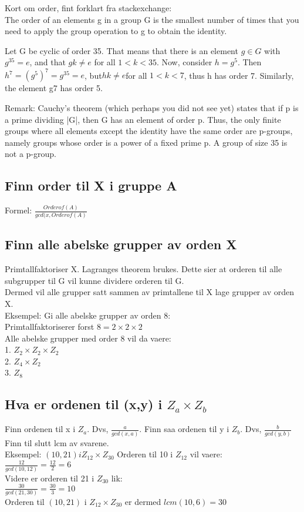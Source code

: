 \documentclass[12pt,a4paper]{article}
\begin{document}
Kort om order, fint forklart fra stackexchange:\\
The order of an elements g in a group G is the smallest number of times that you need to apply the group operation to g to obtain the identity.

Let G be cyclic of order 35. That means that there is an element $g \in G$ with $g^{35}=e$, and that $gk\neq e$ for all $1<k<35$. Now, consider $h=g^5.$ Then $h^7=(g^5)^7=g^{35}=e$, but$ hk \neq e $for all $1<k<7$, thus h has order 7. Similarly, the element g7 has order 5.

Remark: Cauchy's theorem (which perhaps you did not see yet) states that if p is a prime dividing |G|, then G has an element of order p. Thus, the only finite groups where all elements except the identity have the same order are p-groups, namely groups whose order is a power of a fixed prime p. A group of size 35 is not a p-group.

\subsection*{Finn order til X i gruppe A}
Formel: $\frac{Order of(A)}{gcd(x, Order of (A)}$

\subsection*{Finn alle abelske grupper av orden X}
Primtallfaktoriser X. Lagranges theorem brukes. Dette sier at orderen til alle subgrupper til G vil kunne dividere orderen til G. \\
Dermed vil alle grupper satt sammen av primtallene til X lage grupper av orden X.\\
Eksempel: Gi alle abelske grupper av orden 8:\\
Primtallfaktoriserer forst $8 = 2 \times 2 \times 2$\\
Alle abelske grupper med order 8 vil da vaere:\\
1. $Z_2 \times Z_2 \times Z_2$\\
2. $Z_4 \times Z_2$\\
3. $Z_8$

\subsection*{Hva er ordenen til (x,y) i $Z_a \times Z_b$}
Finn ordenen til x i $Z_a$. Dvs, $\frac{a}{gcd(x,a)}. $
Finn saa ordenen til y i $Z_b$. Dvs, $\frac{b}{gcd(y,b)}$
Finn til slutt lcm av svarene.\\
Eksempel: $(10,21) i Z_{12} \times Z_{30}$
Orderen til 10 i $Z_12$ vil vaere:\\
$\frac{12}{gcd(10,12)} = \frac{12}{2} = 6$\\
Videre er orderen til 21 i $Z_{30}$ lik:\\
$\frac{30}{gcd(21,30)} = \frac{30}{3} = 10$\\
Orderen til $(10,21)$ i $Z_{12} \times Z_{30}$ er dermed $lcm(10,6) = 30$\\
\end{document}
